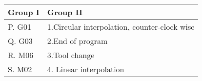 \begin{center}
\begin{tabular}{|l|l|}
\hline
Group I & Group II \\ \hline
P. G01 & 1.Circular interpolation, counter\--clock wise \\ \hline
Q. G03  & 2.End of program \\ \hline
R. M06 & 3.Tool change \\ \hline
S. M02 & 4. Linear interpolation \\ \hline
\end{tabular}
\end{center}
